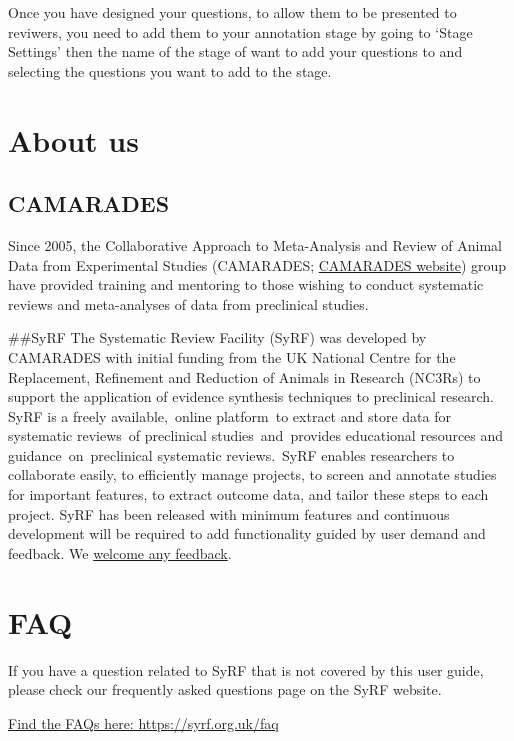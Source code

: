 \documentclass[
]{book}
\begin{document}
Once you have designed your questions, to allow them to be presented to reviwers, you need to add them to your annotation stage by going to `Stage Settings' then the name of the stage of want to add your questions to and selecting the questions you want to add to the stage.

\hypertarget{about}{%
\chapter{About us}\label{about}}

\hypertarget{camarades}{%
\section{CAMARADES}\label{camarades}}

Since 2005, the Collaborative Approach to Meta-Analysis and Review of Animal Data from Experimental Studies (CAMARADES; \href{https://www.ed.ac.uk/clinical-brain-sciences/research/camarades}{CAMARADES website}) group have provided training and mentoring to those wishing to conduct systematic reviews and meta-analyses of data from preclinical studies.

\#\#SyRF
The Systematic Review Facility (SyRF) was developed by CAMARADES with initial funding from the UK National Centre for the Replacement, Refinement and Reduction of Animals in Research (NC3Rs) to support the application of evidence synthesis techniques to preclinical research. SyRF is a freely available,~online platform~to extract and store data for systematic reviews~of preclinical studies~and~provides educational resources and guidance~on~preclinical systematic reviews.~SyRF enables researchers to collaborate easily, to efficiently manage projects, to screen and annotate studies for important features, to extract outcome data, and tailor these steps to each project. SyRF has been released with minimum features and continuous development will be required to add functionality guided by user demand and feedback. We \href{mailto:syrf.info@ed.ac.uk}{welcome any feedback}.

\hypertarget{faq}{%
\chapter{FAQ}\label{faq}}

If you have a question related to SyRF that is not covered by this user guide, please check our frequently asked questions page on the SyRF website.

\href{https://syrf.org.uk/faq}{Find the FAQs here: https://syrf.org.uk/faq}
\end{document}
